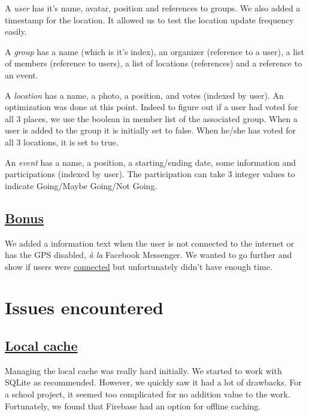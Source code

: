 \documentclass{article}
\begin{document}
A \textit{user} has it's name, avatar, position and references to groups. We also added a timestamp for the location. It allowed us to test the location update frequency easily. 

A \textit{group} has a name (which is it's index), an organizer (reference to a user), a list of members (reference to users), a list of locations (references) and a reference to an event.

A \textit{location} has a name, a photo, a position, and votes (indexed by user). An optimization was done at this point. Indeed to figure out if a user had voted for all 3 places, we use the boolean in member list of the associated group. When a user is added to the group it is initially set to false. When he/she has voted for all 3 locations, it is set to true.

An \textit{event} has a name, a position, a starting/ending date, some information and participations (indexed by user). The participation can take 3 integer values to indicate Going/Maybe Going/Not Going.

\subsection{\href{https://media.giphy.com/media/J0qooSNU20Q3m/giphy.gif}{Bonus}}

We added a information text when the user is not connected to the internet or has the GPS disabled, \textit{à la} Facebook Messenger. We wanted to go further and show if users were \href{https://firebase.google.com/docs/database/android/offline-capabilities#section-sample}{connected} but unfortunately didn't have enough time.

\section{Issues encountered}

\subsection{\href{https://cdn.netlify.com/ecf5f8b45c8f47745f2eff6c5938d1fb34c124f3/4848c/img/blog/instant-cache-invalidation-joy.gif}{Local cache}}

Managing the local cache was really hard initially. We started to work with SQLite as recommended. However, we quickly saw it had a lot of drawbacks. For a school project, it seemed too complicated for no addition value to the work. Fortunately, we found that Firebase had an option for offline caching.
\end{document}
